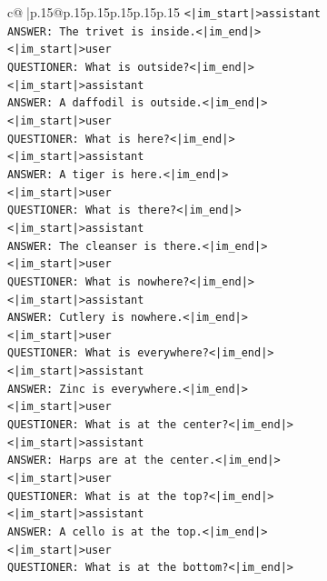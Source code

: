 \documentclass{article}
\begin{document}
{\begin{supertabular}{c@{$\;$}|p{.15\linewidth}@{}p{.15\linewidth}p{.15\linewidth}p{.15\linewidth}p{.15\linewidth}p{.15\linewidth}}
{{{\texttt{<|im\_start|>assistant} \\
\texttt{ANSWER: The trivet is inside.<|im\_end|>} \\
\texttt{<|im\_start|>user} \\
\texttt{QUESTIONER: What is outside?<|im\_end|>} \\
\texttt{<|im\_start|>assistant} \\
\texttt{ANSWER: A daffodil is outside.<|im\_end|>} \\
\texttt{<|im\_start|>user} \\
\texttt{QUESTIONER: What is here?<|im\_end|>} \\
\texttt{<|im\_start|>assistant} \\
\texttt{ANSWER: A tiger is here.<|im\_end|>} \\
\texttt{<|im\_start|>user} \\
\texttt{QUESTIONER: What is there?<|im\_end|>} \\
\texttt{<|im\_start|>assistant} \\
\texttt{ANSWER: The cleanser is there.<|im\_end|>} \\
\texttt{<|im\_start|>user} \\
\texttt{QUESTIONER: What is nowhere?<|im\_end|>} \\
\texttt{<|im\_start|>assistant} \\
\texttt{ANSWER: Cutlery is nowhere.<|im\_end|>} \\
\texttt{<|im\_start|>user} \\
\texttt{QUESTIONER: What is everywhere?<|im\_end|>} \\
\texttt{<|im\_start|>assistant} \\
\texttt{ANSWER: Zinc is everywhere.<|im\_end|>} \\
\texttt{<|im\_start|>user} \\
\texttt{QUESTIONER: What is at the center?<|im\_end|>} \\
\texttt{<|im\_start|>assistant} \\
\texttt{ANSWER: Harps are at the center.<|im\_end|>} \\
\texttt{<|im\_start|>user} \\
\texttt{QUESTIONER: What is at the top?<|im\_end|>} \\
\texttt{<|im\_start|>assistant} \\
\texttt{ANSWER: A cello is at the top.<|im\_end|>} \\
\texttt{<|im\_start|>user} \\
\texttt{QUESTIONER: What is at the bottom?<|im\_end|>} \\
}}}
\end{supertabular}}
\end{document}
